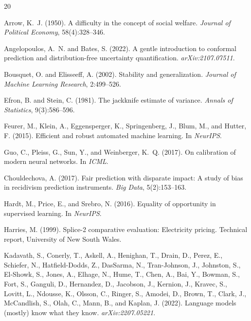 \documentclass[10pt]{article}
\begin{document}

\begin{thebibliography}{20}

Arrow, K.~J. (1950).
\newblock A difficulty in the concept of social welfare.
\newblock \emph{Journal of Political Economy}, 58(4):328--346.

Angelopoulos, A.~N. and Bates, S. (2022).
\newblock A gentle introduction to conformal prediction and distribution-free
  uncertainty quantification.
\newblock \emph{arXiv:2107.07511}.

Bousquet, O. and Elisseeff, A. (2002).
\newblock Stability and generalization.
\newblock \emph{Journal of Machine Learning Research}, 2:499--526.

Efron, B. and Stein, C. (1981).
\newblock The jackknife estimate of variance.
\newblock \emph{Annals of Statistics}, 9(3):586--596.

Feurer, M., Klein, A., Eggensperger, K., Springenberg, J., Blum, M., and
  Hutter, F. (2015).
\newblock Efficient and robust automated machine learning.
\newblock In \emph{NeurIPS}.

Guo, C., Pleiss, G., Sun, Y., and Weinberger, K.~Q. (2017).
\newblock On calibration of modern neural networks.
\newblock In \emph{ICML}.

Chouldechova, A. (2017).
\newblock Fair prediction with disparate impact: A study of bias in recidivism
  prediction instruments.
\newblock \emph{Big Data}, 5(2):153--163.

Hardt, M., Price, E., and Srebro, N. (2016).
\newblock Equality of opportunity in supervised learning.
\newblock In \emph{NeurIPS}.

Harries, M. (1999).
\newblock Splice-2 comparative evaluation: Electricity pricing.
\newblock Technical report, University of New South Wales.

Kadavath, S., Conerly, T., Askell, A., Henighan, T., Drain, D., Perez, E.,
  Schiefer, N., Hatfield-Dodds, Z., DasSarma, N., Tran-Johnson, J.,
  Johnston, S., El-Showk, S., Jones, A., Elhage, N., Hume, T., Chen, A.,
  Bai, Y., Bowman, S., Fort, S., Ganguli, D., Hernandez, D., Jacobson, J.,
  Kernion, J., Kravec, S., Lovitt, L., Ndousse, K., Olsson, C., Ringer, S.,
  Amodei, D., Brown, T., Clark, J., McCandlish, S., Olah, C., Mann, B., and
  Kaplan, J. (2022).
\newblock Language models (mostly) know what they know.
\newblock \emph{arXiv:2207.05221}.


\end{thebibliography}
\end{document}
